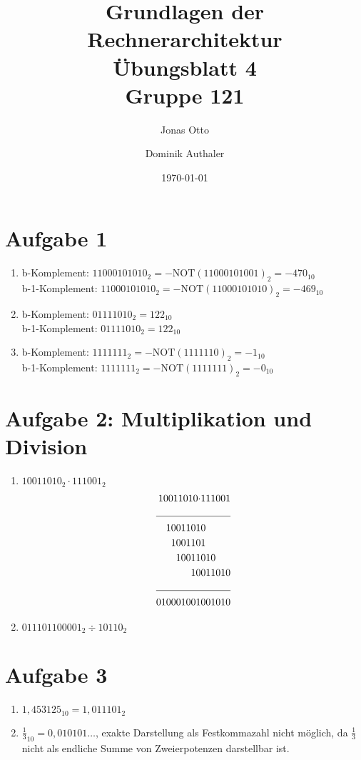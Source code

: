 \documentclass[a4paper]{article}
\title{Grundlagen der Rechnerarchitektur\\ Übungsblatt 4\\Gruppe 121\\}
\author{Jonas Otto\and Dominik Authaler}
\date{\today}
\begin{document}
\maketitle

\section*{Aufgabe 1}
\begin{enumerate}[label=\alph*)]
\item b-Komplement: $11000101010_2 = -\text{NOT}(11000101001)_2 = -470_{10}$ \\
      b-1-Komplement: $11000101010_2 = -\text{NOT}(11000101010)_2 = -469_{10}$
\item b-Komplement: $01111010_2 = 122_{10}$ \\
      b-1-Komplement: $01111010_2 = 122_{10}$
\item b-Komplement: $1111111_2 = -\text{NOT}(1111110)_2 = -1_{10}$ \\
      b-1-Komplement: $1111111_2 = -\text{NOT}(1111111)_2 = -0_{10}$
\end{enumerate}

\section*{Aufgabe 2: Multiplikation und Division}
\begin{enumerate}[label=\alph*)]
\item $10011010_2 \cdot 111001_2$\\
    \begin{equation}
    \begin{split}
        10011010 \cdot &111001\\
        \cline{1-2}
                1001101&0\\
                 100110&1\\
                  10011&010\\
                     10&011010\\
        \cline{1-2}
              010001001&001010\\
    \end{split}
    \end{equation}
\item $011101100001_2 \div 10110_2$
\end{enumerate}

\section*{Aufgabe 3}
\begin{enumerate}[label=\alph*)]
\item $1,453125_{10} = 1,011101_2$
\item $\frac{1}{3}_{10} = 0,010101\ldots$, exakte Darstellung als Festkommazahl nicht möglich,
    da $\frac{1}{3}$ nicht als endliche Summe von Zweierpotenzen darstellbar ist.
\end{enumerate}
\end{document}
